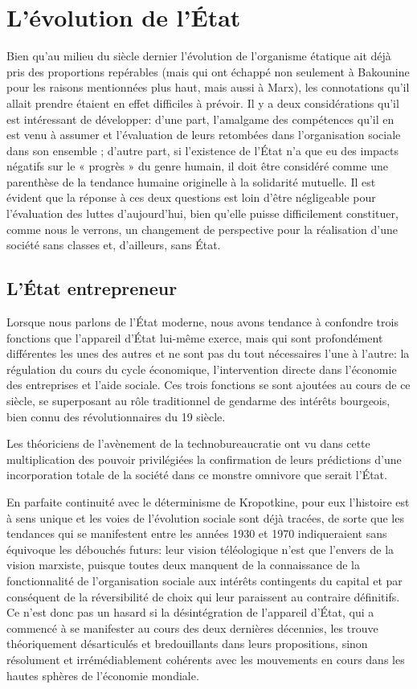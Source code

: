 \chapter{L'évolution de l'État}

Bien qu'au milieu du siècle dernier l'évolution de l'organisme étatique ait déjà pris des proportions repérables (mais qui ont échappé non seulement à Bakounine pour les raisons mentionnées plus haut, mais aussi à Marx), les connotations qu'il allait prendre étaient en effet difficiles à prévoir. Il y a deux considérations qu'il est intéressant de développer: d'une part, l’amalgame des compétences qu'il en est venu à assumer et l'évaluation de leurs retombées dans l'organisation sociale dans son ensemble ; d'autre part, si l’existence de l'État n’a que eu des impacts négatifs sur le « progrès » du genre humain, il doit être considéré comme une parenthèse de la tendance humaine originelle à la solidarité mutuelle. Il est évident que la réponse à ces deux questions est loin d'être négligeable pour l'évaluation des luttes d'aujourd'hui, bien qu'elle puisse difficilement constituer, comme nous le verrons, un changement de perspective pour la réalisation d'une société sans classes et, d'ailleurs, sans État.

\section{L'État entrepreneur}

Lorsque nous parlons de l'État moderne, nous avons tendance à confondre trois fonctions que l'appareil d'État lui-même exerce, mais qui sont profondément différentes les unes des autres et ne sont pas du tout nécessaires l'une à l'autre: la régulation du cours du cycle économique, l'intervention directe dans l'économie des entreprises et l'aide sociale. Ces trois fonctions se sont ajoutées au cours de ce siècle, se superposant au rôle traditionnel de gendarme des intérêts bourgeois, bien connu des révolutionnaires du 19\ieme{} siècle.

Les théoriciens de l'avènement de la technobureaucratie ont vu dans cette multiplication des pouvoir privilégiées la confirmation de leurs prédictions d'une incorporation totale de la société dans ce monstre omnivore que serait l'État.

En parfaite continuité avec le déterminisme de Kropotkine, pour eux l'histoire est à sens unique et les voies de l'évolution sociale sont déjà tracées, de sorte que les tendances qui se manifestent entre les années 1930 et 1970 indiqueraient sans équivoque les débouchés futurs: leur vision téléologique n'est que l'envers de la vision marxiste, puisque toutes deux manquent de la connaissance de la fonctionnalité de l'organisation sociale aux intérêts contingents du capital et par conséquent de la réversibilité de choix qui leur paraissent au contraire définitifs. Ce n'est donc pas un hasard si la désintégration de l'appareil d'État, qui a commencé à se manifester au cours des deux dernières décennies, les trouve théoriquement désarticulés et bredouillants dans leurs propositions, sinon résolument et irrémédiablement cohérents avec les mouvements en cours dans les hautes sphères de l'économie mondiale.

